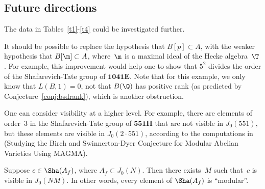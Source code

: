 \documentclass{report}
\begin{document}
\subsection{Future directions}
The data in Tables~\ref{t1}-\ref{t4}
could be investigated further.

It should be possible to replace the hypothesis that $B[p]\subset A$,
with the weaker hypothesis that $B[\m]\subset A$, where~$\m$ is a
maximal ideal of the Hecke algebra~$\T$.  For example, this
improvement would help one to show that $5^2$ divides the order of the
Shafarevich-Tate group of $\mathbf{1041E}$.  Note that for this
example, we only know that $L(B,1)=0$, not that $B(\Q)$ has positive
rank (as predicted by Conjecture~\ref{conj:bsdrank}), which is another
obstruction.

One can consider visibility at a higher level.  For example, there are
elements of order~$3$ in the Shafarevich-Tate group of $\mathbf{551H}$
that are not visible in $J_0(551)$, but these elements are visible in
$J_0(2\cdot 551)$, according to the computations in
\cite{stein:bsdmagma} (Studying the Birch and Swinnerton-Dyer
  Conjecture for Modular Abelian Varieties Using MAGMA).
\begin{conjecture}[Stein]
  Suppose $c\in\Sha(A_f)$, where $A_f\subset J_0(N)$.  Then there
  exists~$M$ such that~$c$ is visible in $J_0(NM)$.  In other words,
  every element of $\Sha(A_f)$ is ``modular''.
\end{conjecture}
\end{document}
